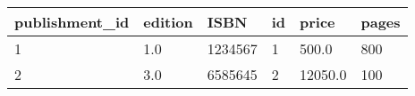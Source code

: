 \begin{longtable}[]{@{}llllll@{}}
\toprule
publishment\_id & edition & ISBN & id & price & pages \\
\midrule
\endhead
1 & 1.0 & 1234567 & 1 & 500.0 & 800 \\
2 & 3.0 & 6585645 & 2 & 12050.0 & 100 \\
\bottomrule
\end{longtable}
